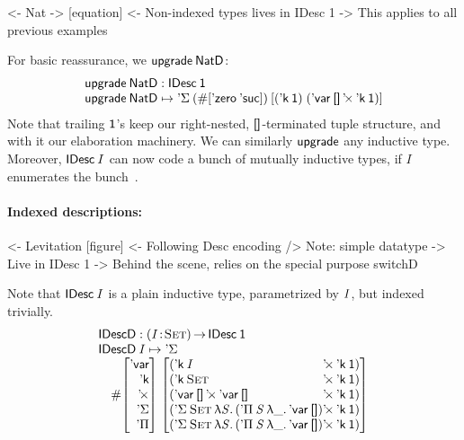 \begin{wstructure}
<- Nat
    -> [equation]
    <- Non-indexed types lives in IDesc 1
        -> This applies to all previous examples
\end{wstructure}

For basic reassurance, we \(\upgrade\:\NatD\):
%
\[\stk{
\upgrade\:\NatD : \IDesc{\Unit} \\
\upgrade\:\NatD \mapsto \DSigma{(\EnumT{\sqr{\NatZero\: \SYMBNatSuc}})}
                     {\sqr{(\DConst{\Unit}) \; 
                           (\DProd{\DVar{\Void}}{\DConst{\Unit}})}}
}\]
%
Note that trailing \(\Unit\)'s keep our right-nested, \(\void\)-terminated
tuple structure, and with it our elaboration machinery.
We can similarly \(\upgrade\) any inductive type.
Moreover, \(\IDesc{I}\) can now code a bunch of mutually
inductive types, if \(I\) enumerates the
bunch~\cite{paulin:habilitation, yakushev:mutual-def}.



\paragraph{Indexed descriptions:}

\begin{wstructure}
<- Levitation [figure]
    <- Following Desc encoding
        /> Note: simple datatype
            -> Live in IDesc 1
    -> Behind the scene, relies on the special purpose switchD
\end{wstructure}

Note that $\IDesc{\V{I}}$ is a plain inductive type, parametrized
by \(\V{I}\), but indexed trivially.
%
\[\stk{
\IDescD : \PI{\V{I}}{\Set} \IDesc{\Unit} \\
\IDescD\: \V{I} \mapsto \SYMBDSigma \\
\quad
 \EnumT\vtup{r}{\SYMBDVar\\
                \SYMBDConst\\
                \DProd{}{}\\
                \SYMBDSigma\\
                \SYMBDPi}
         \; \vtup{l@{}l}{
  (\DProd{\DConst{\V{I}} &}{\DConst{\Unit}})                  \\
  (\DProd{\DConst{\Set}  &}{\DConst{\Unit}})                  \\
  (\DProd{\DVar{\Void}}{\DProd{\DVar{\Void}&}{\DConst{\Unit}}})  \\
  (\DSigma{\Set}{\LAM{\V{S}}
     \DProd{( \DPi{\V{S}}{\LAM{\_} \DVar{\Void}}) &}{\DConst{\Unit}}})     \\
  (\DSigma{\Set}{\LAM{\V{S}}
     \DProd{( \DPi{\V{S}}{\LAM{\_} \DVar{\Void}}) &}{\DConst{\Unit}}})     \\
                                   }
}\]

